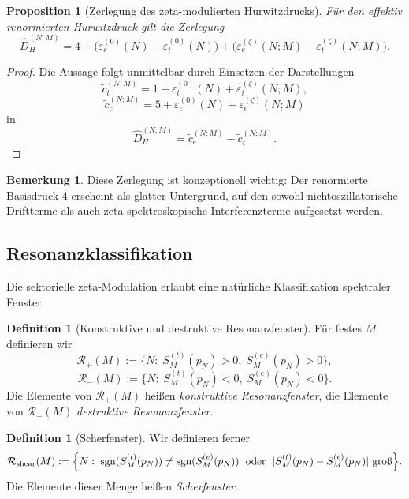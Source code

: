 \documentclass[12pt,a4paper]{article}
\newtheorem{proposition}[satz]{Proposition}
\theoremstyle{definition}
\newtheorem{definition}[satz]{Definition}
\newtheorem{bemerkung}[satz]{Bemerkung}
\begin{document}
	\begin{proposition}[Zerlegung des zeta-modulierten Hurwitzdrucks]
		Für den effektiv renormierten Hurwitzdruck gilt die Zerlegung
		\[
		\widehat D_H^{(N;M)}
		=
		4
		+
		\bigl(\varepsilon_e^{(0)}(N)-\varepsilon_t^{(0)}(N)\bigr)
		+
		\bigl(\varepsilon_e^{(\zeta)}(N;M)-\varepsilon_t^{(\zeta)}(N;M)\bigr).
		\]
	\end{proposition}
	
	\begin{proof}
		Die Aussage folgt unmittelbar durch Einsetzen der Darstellungen
		\[
		\tilde c_t^{(N;M)}
		=
		1+\varepsilon_t^{(0)}(N)+\varepsilon_t^{(\zeta)}(N;M),
		\]
		\[
		\tilde c_e^{(N;M)}
		=
		5+\varepsilon_e^{(0)}(N)+\varepsilon_e^{(\zeta)}(N;M)
		\]
		in
		\[
		\widehat D_H^{(N;M)}=\tilde c_e^{(N;M)}-\tilde c_t^{(N;M)}.
		\]
	\end{proof}
	
	\begin{bemerkung}
		Diese Zerlegung ist konzeptionell wichtig: Der renormierte Basisdruck \(4\) erscheint als glatter Untergrund, auf den sowohl nichtoszillatorische Driftterme als auch zeta-spektroskopische Interferenzterme aufgesetzt werden.
	\end{bemerkung}
	
	\subsection{Resonanzklassifikation}
	
	Die sektorielle zeta-Modulation erlaubt eine natürliche Klassifikation spektraler Fenster.
	
	\begin{definition}[Konstruktive und destruktive Resonanzfenster]
		Für festes \(M\) definieren wir
		\[
		\mathcal R_+(M)
		:=
		\{N:\; S_M^{(t)}(p_N)>0,\;S_M^{(e)}(p_N)>0\},
		\]
		\[
		\mathcal R_-(M)
		:=
		\{N:\; S_M^{(t)}(p_N)<0,\;S_M^{(e)}(p_N)<0\}.
		\]
		Die Elemente von \(\mathcal R_+(M)\) heißen \emph{konstruktive Resonanzfenster}, die Elemente von \(\mathcal R_-(M)\) \emph{destruktive Resonanzfenster}.
	\end{definition}
	
	\begin{definition}[Scherfenster]
		Wir definieren ferner
		\[
		\mathcal R_{\mathrm{shear}}(M)
		:=
		\Bigl\{N:\;
		\operatorname{sgn}(S_M^{(t)}(p_N))\neq \operatorname{sgn}(S_M^{(e)}(p_N))
		\;\text{ oder }\;
		|S_M^{(t)}(p_N)-S_M^{(e)}(p_N)| \text{ groß}
		\Bigr\}.
		\]
		Die Elemente dieser Menge heißen \emph{Scherfenster}.
	\end{definition}
	
\end{document}
